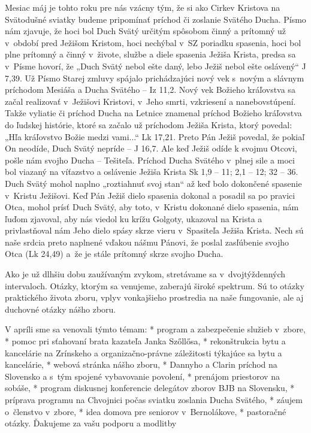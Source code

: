 Mesiac máj je tohto roku pre nás vzácny tým, že si ako Cirkev Kristova na Svätodušné sviatky budeme pripomínať príchod či zoslanie Svätého Ducha. Písmo nám zjavuje, že hoci bol Duch Svätý určitým spôsobom činný a prítomný už v~období pred Ježišom Kristom, hoci nechýbal v~SZ poriadku spasenia, hoci bol plne prítomný a činný v~živote, službe a diele spasenia Ježiša Krista, predsa sa v~Písme hovorí, že „Duch Svätý nebol ešte daný, lebo Ježiš nebol ešte oslávený“ J 7,39. Už Písmo Starej zmluvy spájalo prichádzajúci nový vek s~novým a slávnym príchodom Mesiáša a Ducha Svätého -- Iz 11,2. Nový vek Božieho kráľovstva sa začal realizovať v~Ježišovi Kristovi, v~Jeho smrti, vzkriesení a nanebovstúpení. Takže vyliatie či príchod Ducha na Letnice znamenal príchod Božieho kráľovstva do ľudskej histórie, ktoré sa začalo už príchodom Ježiša Krista, ktorý povedal: „Hľa kráľovstvo Božie medzi vami...“ Lk 17,21. Preto Pán Ježiš povedal, že pokiaľ On neodíde, Duch Svätý nepríde -- J 16,7. Ale keď Ježiš odíde k svojmu Otcovi, pošle nám svojho Ducha -- Tešiteľa. Príchod Ducha Svätého v~plnej sile a moci bol viazaný na víťazstvo a oslávenie Ježiša Krista Sk 1,9 -- 11; 2,1 -- 12; 32 -- 36. Duch Svätý mohol naplno „roztiahnuť svoj stan“ až keď bolo dokončené spasenie v~Kristu Ježišovi. Keď Pán Ježiš dielo spasenia dokonal a posadil sa po pravici Otca, mohol prísť Duch Svätý, aby toto, v~Kristu dokonané dielo spasenia, nám ľuďom zjavoval, aby nás viedol ku krížu Golgoty, ukazoval na Krista a privlastňoval nám Jeho dielo spásy skrze vieru v~Spasiteľa Ježiša Krista. Nech sú naše srdcia preto naplnené vďakou nášmu Pánovi, že poslal zasľúbenie svojho Otca (Lk 24,49) a~že je stále prítomný skrze svojho Ducha.



Ako je už dlhšiu dobu zaužívaným zvykom, stretávame sa v~dvojtýždenných intervaloch. Otázky, ktorým sa venujeme, zaberajú široké spektrum. Sú to otázky praktického života zboru, vplyv vonkajšieho prostredia na naše fungovanie, ale aj duchovné otázky nášho zboru.

V apríli sme sa venovali týmto témam:
\begitems
* program a zabezpečenie služieb v~zbore,
* pomoc pri sťahovaní brata kazateľa Janka Szőllősa,
* rekonštrukcia bytu a kancelárie na Zrínskeho a organizačno-právne záležitosti týkajúce sa bytu a kancelárie,
* webová stránka nášho zboru,
* Dannyho a Clarin príchod na Slovensko a s~tým spojené vybavovanie povolení,
* prenájom priestorov na sobáše,
* program diskusnej konferencie delegátov zborov BJB na Slovensku,
* príprava programu na Chvojnici počas sviatku zoslania Ducha Svätého,
* záujem o~členstvo v~zbore,
* idea domova pre seniorov v~Bernolákove,
* pastoračné otázky.
\enditems
Ďakujeme za vašu podporu a modlitby

